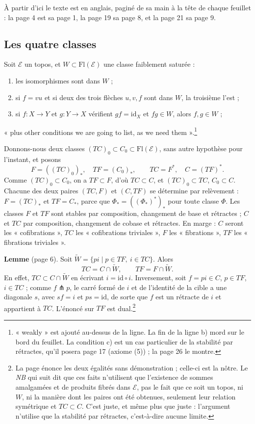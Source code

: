 \documentclass[11pt,a4paper]{article}
\begin{document}
À partir d'ici le texte est en anglais, paginé de sa main à la tête de chaque
feuillet : la page 4 est sa page 1, la page 19 sa page 8, et la page 21 sa
page 9.

\subsection*{Les quatre classes}

Soit $\mathcal{E}$ un topos, et $W \subset \mathrm{Fl}(\mathcal{E})$ une
classe faiblement saturée :
\begin{enumerate}
\item[a)] les isomorphismes sont dans $W$ ;
\item[b)] si $f = vu$ et si deux des trois flèches $u, v, f$ sont dans $W$, la
troisième l'est ;
\item[c)] si $f : X \to Y$ et $g : Y \to X$ vérifient $gf = \mathrm{id}_X$ et
$fg \in W$, alors $f, g \in W$ ;
\end{enumerate}
« plus other conditions we are going to list, as we need them ».\footnote{« weakly » est ajouté au-dessus de la ligne. La fin de la
ligne b) mord sur le bord du feuillet. La condition c) est un cas particulier
de la stabilité par rétractes, qu'il posera page 17 (axiome (5)) ; la page 26 le
montre.}

Donnons-nous deux classes $(TC)_0 \subset C_0 \subset
\mathrm{Fl}(\mathcal{E})$, sans autre hypothèse pour l'instant, et
posons
\[
F = ((TC)_0)_*, \quad TF = (C_0)_*, \qquad TC = F^*, \quad C = (TF)^*.
\]
Comme $(TC)_0 \subset C_0$, on a $TF \subset F$, d'où $TC \subset C$, et
$(TC)_0 \subset TC$, $C_0 \subset C$. Chacune des deux paires $(TC, F)$ et
$(C, TF)$ se détermine par relèvement : $F = (TC)_*$ et $TF = C_*$, parce
que $\Phi_* = ((\Phi_*)^*)_*$ pour toute classe $\Phi$. Les classes $F$ et $TF$
sont stables par composition, changement de base et rétractes ; $C$ et $TC$
par composition, changement de cobase et rétractes. En marge : $C$ seront les
« cofibrations », $TC$ les « cofibrations triviales », $F$ les
« fibrations », $TF$ les « fibrations triviales ».

\textbf{Lemme} (page 6). Soit
$\widetilde W = \{ pi \mid p \in TF,\ i \in TC \}$. Alors
\[
TC = C \cap \widetilde W, \qquad TF = F \cap \widetilde W .
\]
En effet, $TC \subset C \cap \widetilde W$ en écrivant $i = \mathrm{id} \circ
i$. Inversement, soit $f = pi \in C$, $p \in TF$, $i \in TC$ ; comme
$f \pitchfork p$, le carré formé de $i$ et de l'identité de la cible a une
diagonale $s$, avec $sf = i$ et $ps = \mathrm{id}$, de sorte que $f$ est un
rétracte de $i$ et appartient à $TC$. L'énoncé sur $TF$ est dual.\footnote{La
page énonce les deux égalités sans démonstration ; celle-ci est la nôtre. Le
\emph{NB} qui suit dit que ces faits n'utilisent que l'existence de sommes
amalgamées et de produits fibrés dans $\mathcal{E}$, pas le fait que ce soit un
topos, ni $W$, ni la manière dont les paires ont été obtenues, seulement leur
relation symétrique et $TC \subset C$. C'est juste, et même plus que juste :
l'argument n'utilise que la stabilité par rétractes, c'est-à-dire aucune
limite.}
\end{document}
